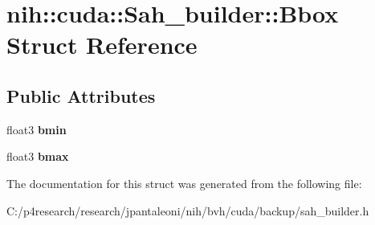 \hypertarget{structnih_1_1cuda_1_1_sah__builder_1_1_bbox}{
\section{nih\-:\-:cuda\-:\-:\-Sah\-\_\-builder\-:\-:\-Bbox \-Struct \-Reference}
\label{structnih_1_1cuda_1_1_sah__builder_1_1_bbox}
}
\subsection*{\-Public \-Attributes}
\begin{DoxyCompactItemize}
\item 
\hypertarget{structnih_1_1cuda_1_1_sah__builder_1_1_bbox_a93f3cd24b09daa61e0bef38afe40ba2a}{
float3 {\bfseries bmin}}
\label{structnih_1_1cuda_1_1_sah__builder_1_1_bbox_a93f3cd24b09daa61e0bef38afe40ba2a}

\item 
\hypertarget{structnih_1_1cuda_1_1_sah__builder_1_1_bbox_a07811ae5c67d6910fb26524d37c5614b}{
float3 {\bfseries bmax}}
\label{structnih_1_1cuda_1_1_sah__builder_1_1_bbox_a07811ae5c67d6910fb26524d37c5614b}

\end{DoxyCompactItemize}


\-The documentation for this struct was generated from the following file\-:\begin{DoxyCompactItemize}
\item 
\-C\-:/p4research/research/jpantaleoni/nih/bvh/cuda/backup/sah\-\_\-builder.\-h\end{DoxyCompactItemize}
